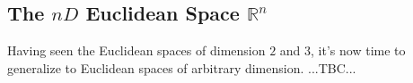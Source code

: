 

\subsection{The $nD$ Euclidean Space $\mathbb{R}^n$}
Having seen the Euclidean spaces of dimension $2$ and $3$, it's now time to generalize to Euclidean spaces of arbitrary dimension. ...TBC...


